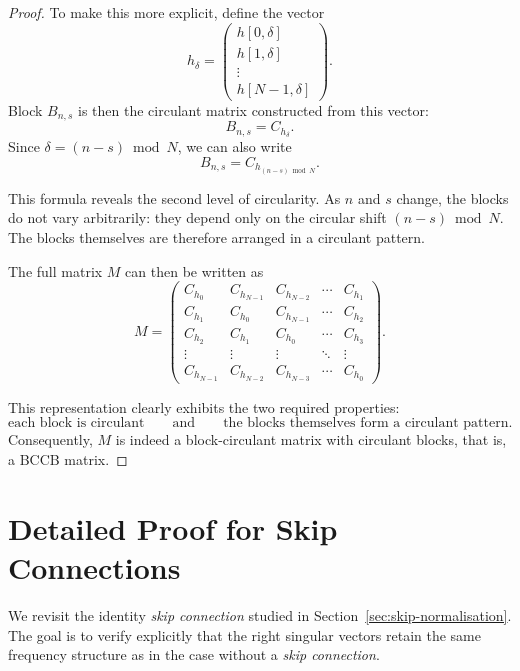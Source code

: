 \begin{proof}
To make this more explicit, define the vector
\[
h_\delta =
\begin{pmatrix}
h[0,\delta] \\
h[1,\delta] \\
\vdots \\
h[N-1,\delta]
\end{pmatrix}.
\]
Block $B_{n,s}$ is then the circulant matrix constructed from this vector:
\[
    B_{n,s}
    =
    C_{h_\delta}.
\]
Since $\delta=(n-s)\bmod N$, we can also write
\[
    B_{n,s}
    =
    C_{h_{(n-s)\bmod N}}.
\]

This formula reveals the second level of circularity. As $n$ and $s$ change,
the blocks do not vary arbitrarily: they depend only on the circular shift
$(n-s)\bmod N$. The blocks themselves are therefore arranged in a circulant pattern.

The full matrix $M$ can then be written as
\[
M =
\begin{pmatrix}
C_{h_0}     & C_{h_{N-1}} & C_{h_{N-2}} & \cdots & C_{h_1} \\
C_{h_1}     & C_{h_0}     & C_{h_{N-1}} & \cdots & C_{h_2} \\
C_{h_2}     & C_{h_1}     & C_{h_0}     & \cdots & C_{h_3} \\
\vdots      & \vdots      & \vdots      & \ddots & \vdots \\
C_{h_{N-1}} & C_{h_{N-2}} & C_{h_{N-3}} & \cdots & C_{h_0}
\end{pmatrix}.
\]

This representation clearly exhibits the two required properties:
\[
    \boxed{\text{each block is circulant}}
    \qquad\text{and}\qquad
    \boxed{\text{the blocks themselves form a circulant pattern}.}
\]
Consequently, $M$ is indeed a block-circulant matrix with circulant blocks, that is,
a BCCB matrix.

\end{proof}

\section{Detailed Proof for Skip Connections}
\label{app:preuve_skip_connection}

We revisit the identity \textit{skip connection} studied in Section~\ref{sec:skip-normalisation}.
The goal is to verify explicitly that the right singular vectors retain the same frequency structure as in the case without a \textit{skip connection}.

